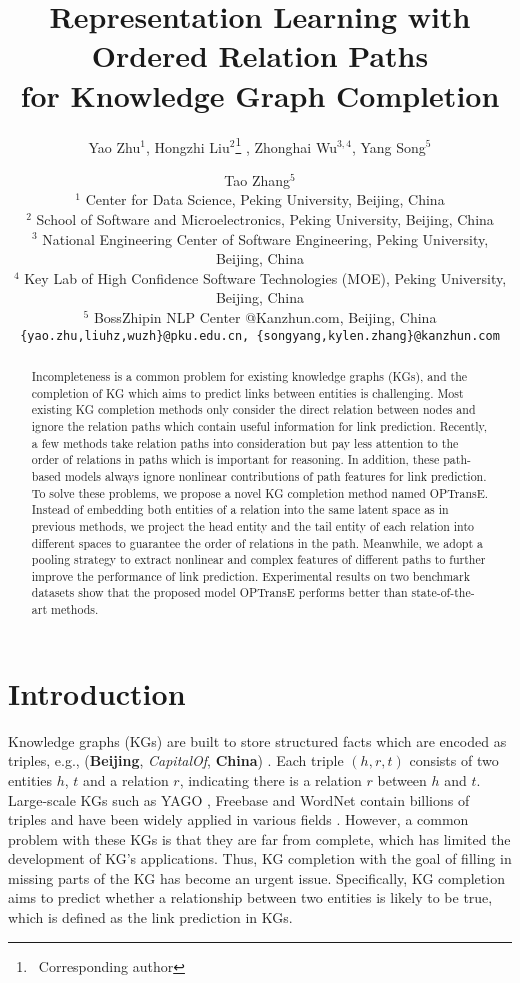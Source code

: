 \documentclass[11pt,a4paper]{article}
\title{Representation Learning with Ordered Relation Paths \\ for Knowledge Graph Completion}
\author{Yao Zhu$^1$, Hongzhi Liu$^2$\thanks{\, Corresponding author} , Zhonghai Wu$^{3,4}$, Yang Song$^5$ \and Tao Zhang$^5$ \\
  $^1$ Center for Data Science, Peking University, Beijing, China \\
  $^2$ School of Software and Microelectronics, Peking University, Beijing, China \\
  $^3$ National Engineering Center of Software Engineering, Peking University, Beijing, China \\
  $^4$ Key Lab of High Confidence Software Technologies (MOE), Peking University, Beijing, China \\
  $^5$ BossZhipin NLP Center @Kanzhun.com, Beijing, China \\
  {\tt \{yao.zhu,liuhz,wuzh\}@pku.edu.cn, \{songyang,kylen.zhang\}@kanzhun.com} \\}
\date{}
\begin{document}
\maketitle

\begin{abstract}
Incompleteness is a common problem for existing knowledge graphs
(KGs), and the completion of KG which aims to predict links between
entities is challenging. Most existing KG completion methods only
consider the direct relation between nodes and ignore the relation
paths which contain useful information for link prediction.
Recently, a few methods take relation paths into consideration but
pay less attention to the order of relations in paths which is
important for reasoning. In addition, these path-based models always
ignore nonlinear contributions of path features for link prediction. To solve these
problems, we propose a novel KG completion method named OPTransE.
Instead of embedding both entities of a relation into the same
latent space as in previous methods, we project the head entity and
the tail entity of each relation into different spaces to guarantee
the order of relations in the path. Meanwhile, we adopt a pooling strategy to
extract nonlinear and complex features of different paths to
further improve the performance of link prediction. Experimental
results on two benchmark datasets show that the proposed model
OPTransE performs better than state-of-the-art methods.
\end{abstract}

\maketitle

\section{Introduction}

Knowledge graphs (KGs) are built to store structured facts which are
encoded as triples, e.g., (\textbf{Beijing}, \textsl{CapitalOf},
\textbf{China}) \cite{lehmann2015dbpedia}. Each triple $(h,r,t)$
consists of two entities ${h}$, ${t}$ and a relation ${r}$,
indicating there is a relation ${r}$ between ${h}$ and ${t}$.
Large-scale KGs such as YAGO \cite{suchanek2007yago}, Freebase
\cite{bollacker2008freebase} and WordNet \cite{miller1995wordnet}
contain billions of triples and have been widely applied in various
fields \cite{riedel2013relation,dong2015question}.
However, a common problem with these KGs is that they are far from
complete, which has limited the development of KG's applications.
Thus, KG completion with the goal of filling in missing parts of the KG
has become an urgent issue. Specifically, KG completion aims to
predict whether a relationship between two entities is likely to be
true, which is defined as the link prediction in KGs.
\end{document}
